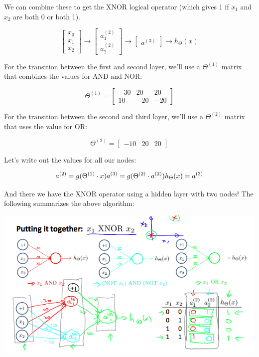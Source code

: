 \documentclass[UTF8]{article}
\begin{document}
We can combine these to get the XNOR logical operator (which gives 1 if $x_1$ and $x_2$ are both 0 or both 1).

\[\begin{bmatrix}x_0 \\ x_1 \\ x_2\end{bmatrix} \rightarrow\begin{bmatrix}a_1^{(2)} \\ a_2^{(2)} \end{bmatrix} \rightarrow\begin{bmatrix}a^{(3)}\end{bmatrix} \rightarrow h_\Theta(x)\]

For the transition between the first and second layer, we'll use a $\Theta^{(1)}$ matrix that combines the values for AND and NOR:

$$\Theta^{(1)} =\begin{bmatrix}-30 & 20 & 20 \\ 10 & -20 & -20\end{bmatrix}$$

For the transition between the second and third layer, we'll use a $\Theta^{(2)}$ matrix that uses the value for OR:

$$\Theta^{(2)} =\begin{bmatrix}-10 & 20 & 20\end{bmatrix}$$

Let's write out the values for all our nodes:

$$a^{(2)} = g(\Theta^{(1)} \cdot x) \\ a^{(3)} = g(\Theta^{(2)} \cdot a^{(2)}) \\ h_\Theta(x) = a^{(3)}$$

And there we have the XNOR operator using a hidden layer with two nodes! The following summarizes the above algorithm:

\includegraphics[width = \textwidth]{NotePics/8_4_1.png}
\end{document}
